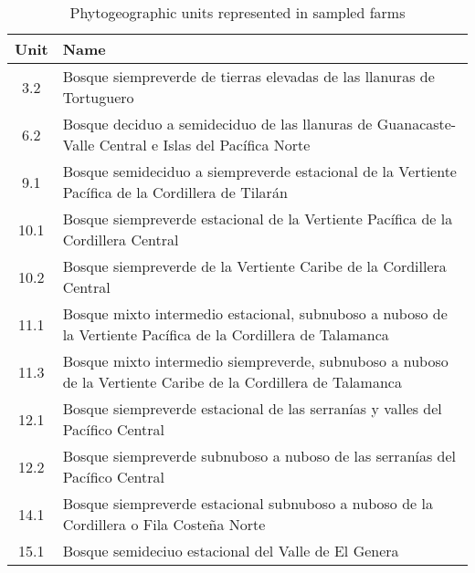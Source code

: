 \begin{table}[!h]
\centering
\caption{\label{tab:phyto_table}Phytogeographic units represented in sampled farms}
\centering
\begin{tabular}[t]{cp{5in}}
\hline\hline
Unit & Name\\
\midrule
3.2 & Bosque siempreverde de tierras elevadas de las llanuras de Tortuguero\\
6.2 & Bosque deciduo a semideciduo de las llanuras de Guanacaste-Valle Central e Islas del Pacífica Norte\\
9.1 & Bosque semideciduo a siempreverde estacional de la Vertiente Pacífica de la Cordillera de Tilarán\\
10.1 & Bosque siempreverde estacional de la Vertiente Pacífica de la Cordillera Central\\
10.2 & Bosque siempreverde de la Vertiente Caribe de la Cordillera Central\\
11.1 & Bosque mixto intermedio estacional, subnuboso a nuboso de la Vertiente Pacífica de la Cordillera de Talamanca\\
11.3 & Bosque mixto intermedio siempreverde, subnuboso a nuboso de la Vertiente Caribe de la Cordillera de Talamanca\\
12.1 & Bosque siempreverde estacional de las serranías y valles del Pacífico Central\\
12.2 & Bosque siempreverde subnuboso a nuboso de las serranías del Pacífico Central\\
14.1 & Bosque siempreverde estacional subnuboso a nuboso de la Cordillera o Fila Costeña Norte\\
15.1 & Bosque semideciuo estacional del Valle de El Genera\\
\hline\hline
\end{tabular}
\end{table}
